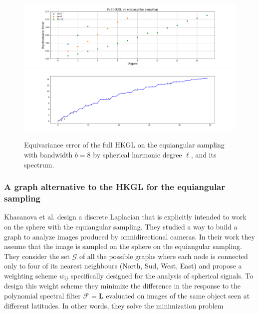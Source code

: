 \begin{figure}[h!]
	\centering
	\includegraphics[width=\textwidth]{../codes/06.Equivariance_error/FullHKGLonequiangularsampling.png}
	\includegraphics[width=\textwidth]{../codes/02.HeatKernelGraphLaplacian/equiangular/equi_full_eigenvalues_16.png}
	\caption{\label{fig:Equivariance error of the full HKGL}Equivariance error of the full HKGL on the equiangular sampling with bandwidth $b=8$ by spherical harmonic degree $\ell$, and its spectrum.}
\end{figure}

\subsubsection{A graph alternative to the HKGL for the equiangular sampling}\label{sec:Chapter3:Frossard}

Khasanova et al. \cite{Frossard2017GraphBasedCO} design a discrete Laplacian that is explicitly intended to work on the sphere with the equiangular sampling. They studied a way to build a graph to analyze images produced by omnidirectional cameras. In their work they assume that the image is sampled on the sphere on the equiangular sampling. They consider the set $\mathcal G$ of all the possible graphs where each node is connected only to four of its nearest neighbours (North, Sud, West, East) and propose a weighting scheme $w_{ij}$ specifically designed for the analysis of spherical signals. To design this weight scheme they minimize the difference in the response to the polynomial spectral filter $\mathcal F = \mathbf L$ evaluated on images of the same object seen at different latitudes. In other words, they solve the minimization problem

